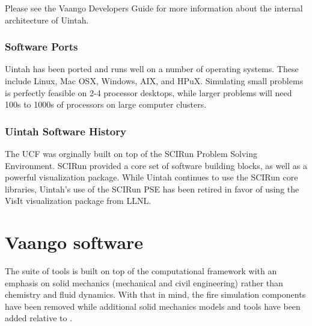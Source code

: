 Please see the Vaango Developers Guide for more
information about the internal architecture of Uintah.

\subsubsection{Software Ports}

Uintah has been ported and runs well on a number of operating
systems.  These include Linux, Mac OSX, Windows, AIX, and HPuX. Simulating
small problems is perfectly feasible on 2-4 processor desktops, while
larger problems will need 100s to 1000s of processors on large
computer clusters. 

\subsubsection{Uintah Software History}

The UCF was orginally built on top of the SCIRun Problem Solving
Environment.  SCIRun provided a core set of software building blocks,
as well as a powerful visualization package.  While Uintah continues
to use the SCIRun core libraries, Uintah's use of the SCIRun PSE has
been retired in favor of using the VisIt visualization package from
LLNL.

\section{Vaango software}
The \Vaango suite of tools is built on top of the \Uintah computational
framework with an emphasis on solid mechanics (mechanical and civil
engineering) rather than chemistry and fluid dynamics.  With that
in mind, the fire simulation components have been removed while
additional solid mechanics models and tools have been added relative
to \Uintah.
